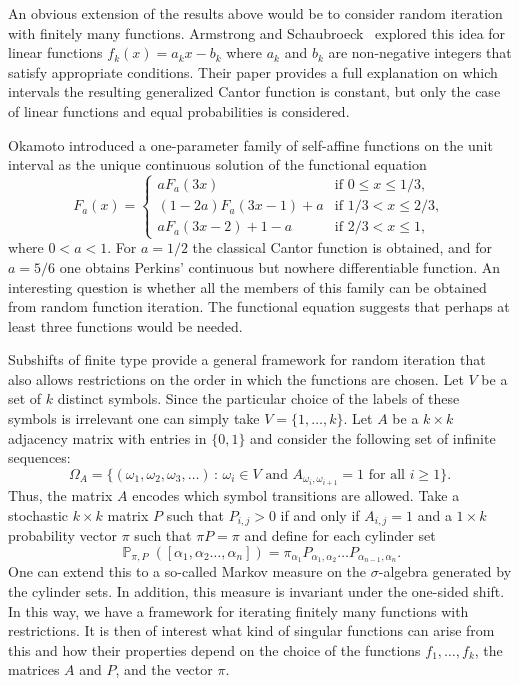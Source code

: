 \documentclass[a4paper,12pt]{article}
\DeclareMathOperator{\prob}{\mathbb{P}}
\begin{document}
An obvious extension of the results above would be to consider random iteration with finitely many functions. Armstrong and Schaubroeck~\cite{ArmstrongSchaubroeck:2020} explored this idea for linear functions $f_k(x) = a_k x - b_k$ where $a_k$ and $b_k$ are non-negative integers that satisfy appropriate conditions. Their paper provides a full explanation on which intervals the resulting generalized Cantor function is constant, but only the case of linear functions and equal probabilities is considered.

Okamoto \cite{Okamoto:2005} introduced a one-parameter family of self-affine functions on the unit interval as the unique continuous solution of the functional equation
\[
F_a(x)
=
\begin{cases}
a F_a(3x)			& \text{if } 0 \leq x \leq 1/3, \\
(1-2a)F_a(3x-1) + a	& \text{if } 1/3 < x \leq 2/3, \\
a F_a(3x-2) + 1-a	& \text{if } 2/3 < x \leq 1,
\end{cases}
\]
where $0 < a < 1$. For $a=1/2$ the classical Cantor function is obtained, and for $a=5/6$ one obtains Perkins' continuous but nowhere differentiable function. An interesting question is whether all the members of this family can be obtained from random function iteration. The functional equation suggests that perhaps at least three functions would be needed.

Subshifts of finite type \cite{Berger:2001} provide a general framework for random iteration that also allows restrictions on the order in which the functions are chosen. Let $V$ be a set of $k$ distinct symbols. Since the particular choice of the labels of these symbols is irrelevant one can simply take $V=\{1,\dots,k\}$. Let $A$ be a $k \times k$ adjacency matrix with entries in $\{0,1\}$ and consider the following set of infinite sequences:
\[
\Omega_A
	= \big\{(\omega_1,\omega_2,\omega_3,\dots) \,:\, \omega_i \in V \text{ and } A_{\omega_i, \omega_{i+1}} = 1 \text{ for all } i \geq 1\big\}.
\]
Thus, the matrix $A$ encodes which symbol transitions are allowed. Take a stochastic $k\times k$ matrix $P$ such that $P_{i,j}>0$ if and only if $A_{i,j}=1$ and a $1 \times k$ probability vector $\pi$ such that $\pi P = \pi$ and define for each cylinder set
\[
\prob_{\pi, P}([\alpha_1,\alpha_2\dots,\alpha_n]) = \pi_{\alpha_1} P_{\alpha_1,\alpha_2}\dots P_{\alpha_{n-1},\alpha_n}.
\]
One can extend this to a so-called Markov measure on the $\sigma$-algebra generated by the cylinder sets. In addition, this measure is invariant under the one-sided shift. In this way, we have a framework for iterating finitely many functions with restrictions. It is then of interest what kind of singular functions can arise from this and how their properties depend on the choice of the functions $f_1,\dots,f_k$, the matrices $A$ and $P$, and the vector $\pi$.
\end{document}
